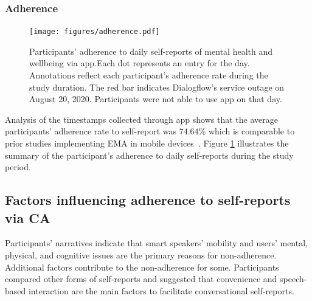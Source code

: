     \subsubsection{Adherence}  
    \begin{figure}
        \centering
        \texttt{[image: figures/adherence.pdf]}
        \caption{Participants' adherence to daily self-reports of mental health and wellbeing via \acl{app}.Each dot represents an entry for the day. Annotations reflect each participant's adherence rate during the study duration. The red bar indicates Dialogflow's service outage on August 20, 2020. Participants were not able to use \acl{app} on that day.}
        \label{fig:adherence}
    \end{figure}
    
    Analysis of the timestamps collected through \acl{app} shows that the average participants' adherence rate to self-report was $74.64\%$ which is comparable to prior studies implementing \ac{EMA} in mobile devices~\cite{wen2017compliance}. Figure \ref{fig:adherence} illustrates the summary of the participant's adherence to daily self-reports during the study period. 
    

    






\subsection{Factors influencing adherence to self-reports via \ac{CA} }
        
    Participants' narratives indicate that smart speakers' mobility and users' mental, physical, and cognitive issues are the primary reasons for non-adherence. Additional factors contribute to the non-adherence for some.
    Participants compared other forms of self-reports and suggested that convenience and speech-based interaction are the main factors to facilitate conversational self-reports.

